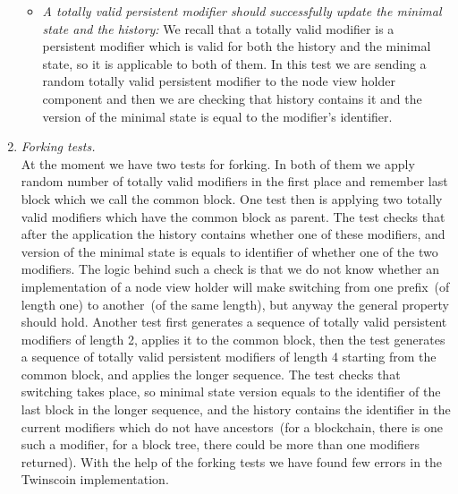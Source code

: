 \begin{enumerate}[\IEEEsetlabelwidth{Z}]
\begin{itemize}[]

\item \textit{A totally valid persistent modifier should successfully update the minimal state and the history:} We recall that a totally valid modifier is a persistent modifier which is valid for both the history and the minimal state, so it is applicable to both of them. In this test we are sending a random totally valid persistent modifier to the node view holder component and then we are checking that history contains it and the version of the minimal state is equal to the modifier's identifier.\\
\end{itemize}

\item \textit{Forking tests.}\\
At the moment we have two tests for forking. In both of them we apply random number of totally valid modifiers in the first place and remember last block which we call the common block. One test then is applying two totally valid modifiers which have the common block as parent. The test checks that after the application the history contains whether one of these modifiers, and version of the minimal state is equals to identifier of whether one of the two modifiers. The logic behind such a check is that we do not know whether an implementation of a node view holder will make switching from one prefix~(of length one) to another~(of the same length), but anyway the general property should hold. Another test first generates a sequence of totally valid persistent modifiers of length 2, applies it to the common block, then the test generates a sequence of totally valid persistent modifiers of length 4 starting from the common block, and applies the longer sequence. The test checks that switching takes place, so minimal state version equals to the identifier of the last block in the longer sequence, and the history contains the identifier in the current modifiers which do not have ancestors~(for a blockchain, there is one such a modifier, for a block tree, there could be more than one modifiers returned). With the help of the forking tests we have found few errors in the Twinscoin implementation. 


\end{enumerate}



